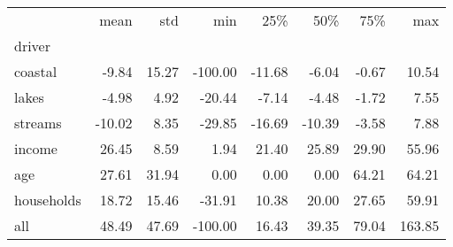 \begin{tabular}{lrrrrrrr}
\toprule
 & mean & std & min & 25\% & 50\% & 75\% & max \\
driver &  &  &  &  &  &  &  \\
\midrule
coastal & -9.84 & 15.27 & -100.00 & -11.68 & -6.04 & -0.67 & 10.54 \\
lakes & -4.98 & 4.92 & -20.44 & -7.14 & -4.48 & -1.72 & 7.55 \\
streams & -10.02 & 8.35 & -29.85 & -16.69 & -10.39 & -3.58 & 7.88 \\
income & 26.45 & 8.59 & 1.94 & 21.40 & 25.89 & 29.90 & 55.96 \\
age & 27.61 & 31.94 & 0.00 & 0.00 & 0.00 & 64.21 & 64.21 \\
households & 18.72 & 15.46 & -31.91 & 10.38 & 20.00 & 27.65 & 59.91 \\
all & 48.49 & 47.69 & -100.00 & 16.43 & 39.35 & 79.04 & 163.85 \\
\bottomrule
\end{tabular}
